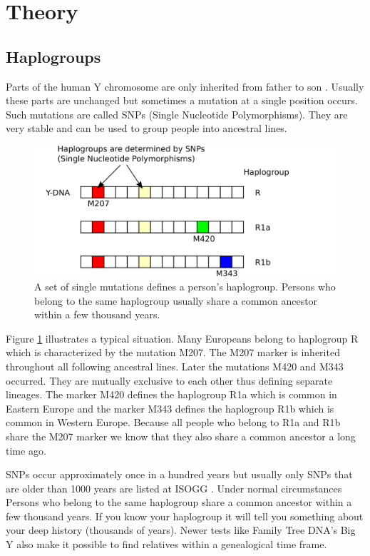 \section{Theory}

\subsection{Haplogroups}

Parts of the human Y chromosome are only inherited from father to
son \cite{YFullMutationRate, BigYWhitePaper}.
Usually these parts are unchanged but sometimes
a mutation at a single position occurs. Such mutations are
called SNPs (Single Nucleotide Polymorphisms). They are
very stable and can be used to group people into ancestral
lines.

\begin{figure}[ht]
\centering
\includegraphics[width=13cm]{img/haplogroups.png}
\caption{\label{haplogroup} A set of single mutations
defines a person's haplogroup. Persons who belong to the
same haplogroup usually share a common ancestor within a
few thousand years.}
\end{figure}

Figure \ref{haplogroup} illustrates a typical situation.
Many Europeans belong to haplogroup R which is characterized
by the mutation M207.
The M207 marker is inherited throughout all following ancestral
lines. Later the mutations M420 and M343 occurred. They are
mutually exclusive to each other thus defining separate
lineages. The marker M420 defines the haplogroup R1a which
is common in Eastern Europe and the marker M343 defines the
haplogroup R1b which is common in Western Europe. Because
all people who belong to R1a and R1b share the M207 marker
we know that they also share a common ancestor a long time
ago.

SNPs occur approximately once in a hundred years \cite{YFullMutationRate}
but usually only SNPs that are older than 1000 years are
listed at ISOGG \cite{ISOGGSNPCriteria}. Under normal
circumstances Persons who belong to the same haplogroup
share a common ancestor within a few thousand years.
If you know your haplogroup it will tell you something about
your deep history (thousands of years).
Newer tests like Family Tree DNA's Big Y \cite{BigYWhitePaper}
also make it possible to find relatives within a genealogical
time frame.


